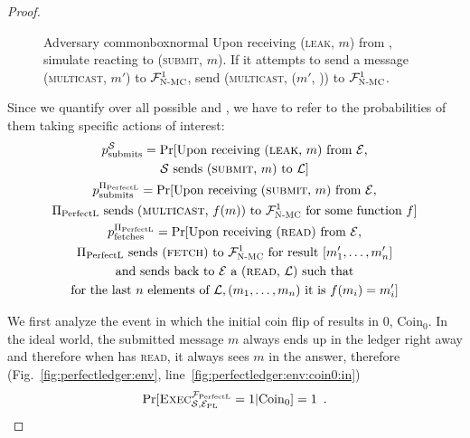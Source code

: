\begin{proof}
    \begin{figure}[H]
      \begin{titlebox}{Adversary \normalfont \perfectadv}{commonbox}{normal}
        Upon receiving (\textsc{leak}, $m$) from \perfectenv, simulate
        \perfectprot{} reacting to (\textsc{submit}, $m$). If it attempts to
        send a message (\textsc{multicast}, $m'$) to $\mathcal{F}_{\textsc{N-MC}}^1$, send
        (\textsc{multicast}, ($m'$, \alice)) to $\mathcal{F}_{\textsc{N-MC}}^1$.
      \end{titlebox}
      \caption{}
      \label{fig:perfectledger:adv}
    \end{figure}

    Since we quantify over all possible \simulator{} and \perfectprot, we have
    to refer to the probabilities of them taking specific actions of interest:
    \begin{gather*}
      p^{\mathcal{S}}_{\mathrm{submits}} = \Pr[\text{Upon receiving (\textsc{leak}, $m$) from
      \ensuremath{\mathcal{E}},} \\
      \text{\ensuremath{\mathcal{S}}{} sends (\textsc{submit}, $m$) to $\mathcal{L}$}] \\
      p^{\Pi_{\mathrm{PerfectL}}}_{\mathrm{submits}} = \Pr[\text{Upon receiving (\textsc{submit}, $m$) from
      \ensuremath{\mathcal{E}},} \\
      \text{\ensuremath{\Pi_{\mathrm{PerfectL}}}{} sends (\textsc{multicast}, $f(m)$) to
      $\mathcal{F}_{\textsc{N-MC}}^1$ for some function $f$}]
      \\
      p^{\Pi_{\mathrm{PerfectL}}}_{\mathrm{fetches}} = \Pr[\text{Upon receiving (\textsc{read}) from \ensuremath{\mathcal{E}},}
      \\
      \text{\ensuremath{\Pi_{\mathrm{PerfectL}}}{} sends (\textsc{fetch}) to $\mathcal{F}_{\textsc{N-MC}}^1$ for result
      } [m_1', \dots, m_n'] \\
      \text{and sends back to \ensuremath{\mathcal{E}}{} a (\textsc{read}, $\mathcal{L}$)
      such that} \\
      \text{for the last $n$ elements of $\mathcal{L}, (m_1, \dots, m_n)$ it is
      } f(m_i) = m_i']
    \end{gather*}

    We first analyze the event in which the initial coin flip of \environment{}
    results in 0, $\mathrm{Coin}_0$. In the ideal world, the submitted message
    $m$ always ends up in the ledger right away and therefore when
    \environment{} has \bob{} \textsc{read}, it always sees $m$ in the answer,
    therefore (Fig.~\ref{fig:perfectledger:env},
    line~\ref{fig:perfectledger:env:coin0:in})
    \begin{equation}
    \label{eq:coin0:ideal}
      \Pr[\textsc{Exec}^{\perfectledger}_{\simulator, \perfectenv} = 1 |
      \mathrm{Coin}_0] = 1 \enspace.
    \end{equation}


\end{proof}
